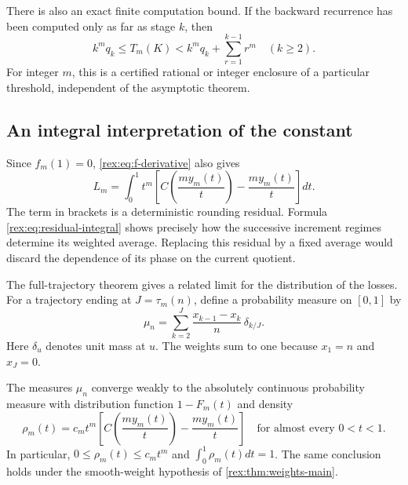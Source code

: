 There is also an exact finite computation bound. If the backward
recurrence has been computed only as far as stage $k$, then
\begin{equation}\label{rex:eq:partial-computation}
 k^m q_k\leq T_m(K)<k^m q_k+\sum_{r=1}^{k-1}r^m
 \quad(k\geq2).
\end{equation}
For integer $m$, this is a certified rational or integer enclosure of a
particular threshold, independent of the asymptotic theorem.

\subsection{An integral interpretation of the constant}

Since $f_m(1)=0$, \cref{rex:eq:f-derivative} also gives
\begin{equation}\label{rex:eq:residual-integral}
 L_m=\int_0^1t^m
 \left[C\!\left(\frac{my_m(t)}t\right)
             -\frac{my_m(t)}t\right]dt.
\end{equation}
The term in brackets is a deterministic rounding residual. Formula
\cref{rex:eq:residual-integral} shows precisely how the successive
increment regimes determine its weighted average. Replacing this
residual by a fixed average would discard the dependence of its phase
on the current quotient.

The full-trajectory theorem gives a related limit for the distribution
of the losses. For a trajectory ending at $J=\tau_m(n)$, define a
probability measure on $[0,1]$ by
\begin{equation}\label{rex:eq:loss-measure}
 \mu_n=\sum_{k=2}^{J}\frac{x_{k-1}-x_k}{n}\,\delta_{k/J}.
\end{equation}
Here $\delta_u$ denotes unit mass at $u$. The weights sum to one because
$x_1=n$ and $x_J=0$.

\begin{corollary}\label{rex:cor:losses}
The measures $\mu_n$ converge weakly to the absolutely continuous
probability measure with distribution function $1-F_m(t)$ and density
\begin{equation}\label{rex:eq:loss-density}
 \rho_m(t)=c_m t^m
 \left[C\!\left(\frac{my_m(t)}t\right)
             -\frac{my_m(t)}t\right]
 \quad\text{for almost every }0<t<1.
\end{equation}
In particular, $0\leq\rho_m(t)\leq c_m t^m$ and
$\int_0^1\rho_m(t)dt=1$. The same conclusion holds under the
smooth-weight hypothesis of \cref{rex:thm:weights-main}.
\end{corollary}

